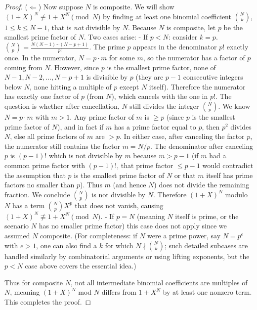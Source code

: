 \documentclass[11pt]{article}
\begin{document}
{\begin{proof}
($\Leftarrow$) Now suppose $N$ is composite. We will show $(1+X)^N \not\equiv 1 + X^N \pmod{N}$ by finding at least one binomial coefficient $ \binom{N}{k}$, $1\le k \le N-1$, that is \emph{not} divisible by $N$. Because $N$ is composite, let $p$ be the smallest prime factor of $N$. Two cases arise:
- If $p < N$: consider $k=p$. $\binom{N}{p} = \frac{N (N-1)\cdots (N-p+1)}{p!}$. The prime $p$ appears in the denominator $p!$ exactly once. In the numerator, $N = p \cdot m$ for some $m$, so the numerator has a factor of $p$ coming from $N$. However, since $p$ is the smallest prime factor, none of $N-1, N-2, \dots, N-p+1$ is divisible by $p$ (they are $p-1$ consecutive integers below $N$, none hitting a multiple of $p$ except $N$ itself). Therefore the numerator has exactly one factor of $p$ (from $N$), which cancels with the one in $p!$. The question is whether after cancellation, $N$ still divides the integer $\binom{N}{p}$. We know $N = p \cdot m$ with $m>1$. Any prime factor of $m$ is $\ge p$ (since $p$ is the smallest prime factor of $N$), and in fact if $m$ has a prime factor equal to $p$, then $p^2$ divides $N$, else all prime factors of $m$ are $>p$. In either case, after canceling the factor $p$, the numerator still contains the factor $m = N/p$. The denominator after canceling $p$ is $(p-1)!$ which is not divisible by $m$ because $m > p-1$ (if $m$ had a common prime factor with $(p-1)!$, that prime factor $\le p-1$ would contradict the assumption that $p$ is the smallest prime factor of $N$ or that $m$ itself has prime factors no smaller than $p$). Thus $m$ (and hence $N$) does not divide the remaining fraction. We conclude $\binom{N}{p}$ is not divisible by $N$. Therefore $(1+X)^N$ modulo $N$ has a term $\binom{N}{p}X^p$ that does not vanish, causing $(1+X)^N \not\equiv 1+X^N \pmod{N}$.
- If $p = N$ (meaning $N$ itself is prime, or the scenario $N$ has no smaller prime factor) this case does not apply since we assumed $N$ composite. (For completeness: if $N$ were a prime power, say $N = p^e$ with $e>1$, one can also find a $k$ for which $N \nmid \binom{N}{k}$; such detailed subcases are handled similarly by combinatorial arguments or using lifting exponents, but the $p < N$ case above covers the essential idea.)

Thus for composite $N$, not all intermediate binomial coefficients are multiples of $N$, meaning $(1+X)^N$ mod $N$ differs from $1 + X^N$ by at least one nonzero term. This completes the proof.
\end{proof}

}
\end{document}
